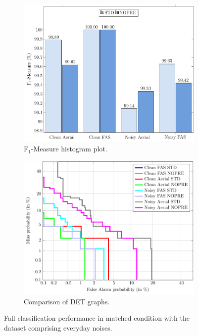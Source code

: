 \begin{figure}[t]
	\centering
	\begin{subfigure}[b]{0.8\textwidth}
		\includegraphics[width=\textwidth]{img/winr2016/pgfsource/8_bck_matched/BAR_8_bck_matched.pdf}
		\caption{F$_1$-Measure histogram plot.}\label{fig:match_bck_BAR}
	\end{subfigure}
	\hspace{5mm}
	\begin{subfigure}[b]{0.8\textwidth}
		\includegraphics[width=\textwidth]{img/winr2016/matlab2tikz/8_bck_matched/DET_8_bck_matched.pdf}
		\caption{ Comparison of DET graphs.}\label{fig:match_bck_DET}
	\end{subfigure}
	\caption{Fall classification performance in matched condition with the dataset comprising everyday noises.}\label{fig:match_bck}

\end{figure}

